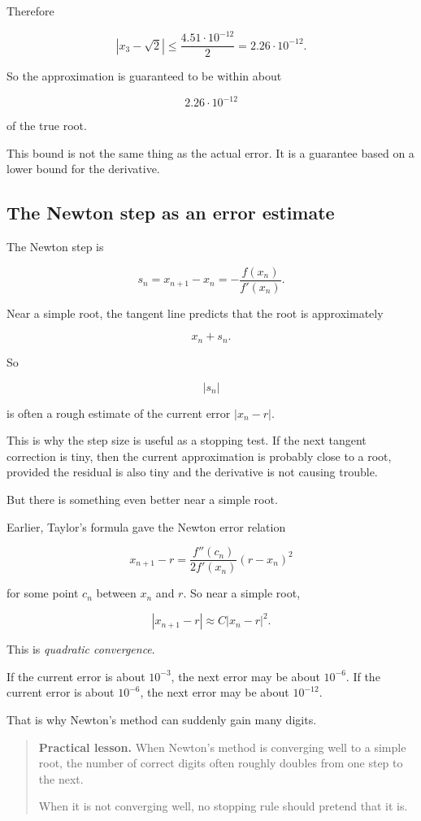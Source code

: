 Therefore

\[
|x_3-\sqrt2|
\le
\frac{4.51\cdot10^{-12}}{2}
=
2.26\cdot10^{-12}.
\]

So the approximation is guaranteed to be within about

\[
2.26\cdot10^{-12}
\]

of the true root.

This bound is not the same thing as the actual error.  It is a guarantee based on a lower
bound for the derivative.

\subsection{The Newton step as an error estimate}
\label{subsec:newton-step-error-estimate}

The Newton step is

\[
s_n=x_{n+1}-x_n=-\frac{f(x_n)}{f'(x_n)}.
\]

Near a simple root, the tangent line predicts that the root is approximately

\[
x_n+s_n.
\]

So

\[
|s_n|
\]

is often a rough estimate of the current error \(|x_n-r|\).

This is why the step size is useful as a stopping test.  If the next tangent correction is
tiny, then the current approximation is probably close to a root, provided the residual is
also tiny and the derivative is not causing trouble.

But there is something even better near a simple root.

Earlier, Taylor's formula gave the Newton error relation

\[
x_{n+1}-r
=
\frac{f''(c_n)}{2f'(x_n)}(r-x_n)^2
\]

for some point \(c_n\) between \(x_n\) and \(r\).  So near a simple root,

\[
\boxed{
|x_{n+1}-r|\approx C|x_n-r|^2.
}
\]

This is \emph{quadratic convergence}.

If the current error is about \(10^{-3}\), the next error may be about \(10^{-6}\).  If the
current error is about \(10^{-6}\), the next error may be about \(10^{-12}\).

That is why Newton's method can suddenly gain many digits.

\begin{quote}
\textbf{Practical lesson.}
When Newton's method is converging well to a simple root, the number of correct
digits often roughly doubles from one step to the next.

When it is not converging well, no stopping rule should pretend that it is.
\end{quote}

